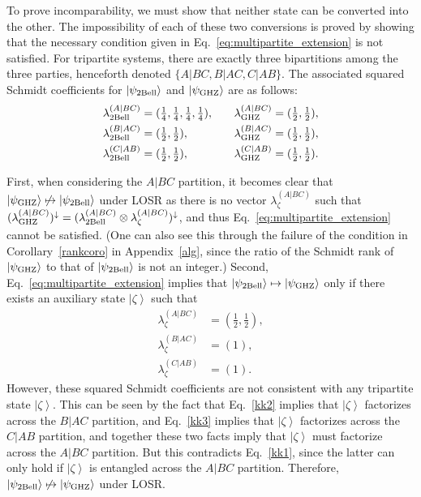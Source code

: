 \documentclass[prx,11pt,letterpaper,twocolumn,accepted=2023-11-27]{quantumarticle}
\newcommand{\ket}[1]{\left| #1 \right>}
\theoremstyle{plain}
\theoremstyle{definition}
\begin{document}
\begin{appendices}
To prove incomparability, we must show that neither state can be converted into the other. The impossibility of each of these two conversions is proved by showing that the necessary condition given in Eq.~\eqref{eq:multipartite_extension} is not satisfied.
For tripartite systems, there are exactly three bipartitions among the three parties, henceforth denoted $\{A|BC, B|AC, C|AB\}$. The associated squared Schmidt coefficients for $\ket{\psi_{\rm 2Bell}}$ and $|\psi_{\rm GHZ}\rangle$ are as follows:
\begin{equation}
    \begin{alignedat}{3}
        \lambda^{(A|BC)}_{\rm 2Bell}
        &= (\tfrac{1}{4},\tfrac{1}{4},\tfrac{1}{4},\tfrac{1}{4}),
        \qquad 
        &&\lambda^{(A|BC)}_{\rm GHZ}
        &&= (\tfrac{1}{2},\tfrac{1}{2}),\\
        \lambda^{(B|AC)}_{\rm 2Bell}
        &= (\tfrac{1}{2},\tfrac{1}{2}),
        &&\lambda^{(B|AC)}_{\rm GHZ}
        &&= (\tfrac{1}{2},\tfrac{1}{2}),\\
        \lambda^{(C|AB)}_{\rm 2Bell}
        &= (\tfrac{1}{2},\tfrac{1}{2}),
        &&\lambda^{(C|AB)}_{\rm GHZ}
        &&= (\tfrac{1}{2},\tfrac{1}{2}).
    \end{alignedat}
\end{equation}

First, when considering the $A|BC$ partition, it becomes clear that $|\psi_{\rm GHZ}\rangle \not \mapsto |\psi_{\rm 2Bell}\rangle$ under LOSR as there is no vector $\lambda^{(A|BC)}_{\zeta}$ such that $(\lambda^{(A|BC)}_{\rm GHZ})^{\downarrow} = (\lambda^{(A|BC)}_{\rm 2Bell}\otimes \lambda^{(A|BC)}_{\zeta})^{\downarrow}$, and thus Eq.~\eqref{eq:multipartite_extension} cannot be satisfied. (One can also see this through the failure of the condition in Corollary~\ref{rankcoro} in Appendix~\ref{alg}, since the ratio of the Schmidt rank of $|\psi_{\rm GHZ}\rangle$ to that of $|\psi_{\rm 2Bell}\rangle$
 is not an integer.)
Second, Eq.~\eqref{eq:multipartite_extension} implies that $|\psi_{\rm 2Bell}\rangle \mapsto |\psi_{\rm GHZ}\rangle$ only if there exists an auxiliary state $\ket{\zeta}$ such that
\begin{align}
    \lambda^{(A|BC)}_{\zeta} &= (\tfrac{1}{2},\tfrac{1}{2}),\label{kk1}\\
    \lambda^{(B|AC)}_{\zeta} &= (1),\label{kk2}\\
    \lambda^{(C|AB)}_{\zeta} &= (1).\label{kk3}
\end{align}
However, these squared Schmidt coefficients are not consistent with any tripartite state $\ket \zeta$. This can be seen by the fact that Eq.~\eqref{kk2} implies that $\ket \zeta$ factorizes across the $B|AC$ partition, and Eq.~\eqref{kk3} implies that $\ket \zeta$ factorizes across the $C|AB$ partition, and together these two facts imply that $\ket \zeta$ must factorize across the $A|BC$ partition. But this contradicts Eq.~\eqref{kk1}, since the latter can only hold if $\ket \zeta$ is entangled
  across the $A|BC$ partition. Therefore, $|\psi_{\rm 2Bell}\rangle \not \mapsto |\psi_{\rm GHZ}\rangle$ under LOSR.


\end{appendices}
\end{document}
